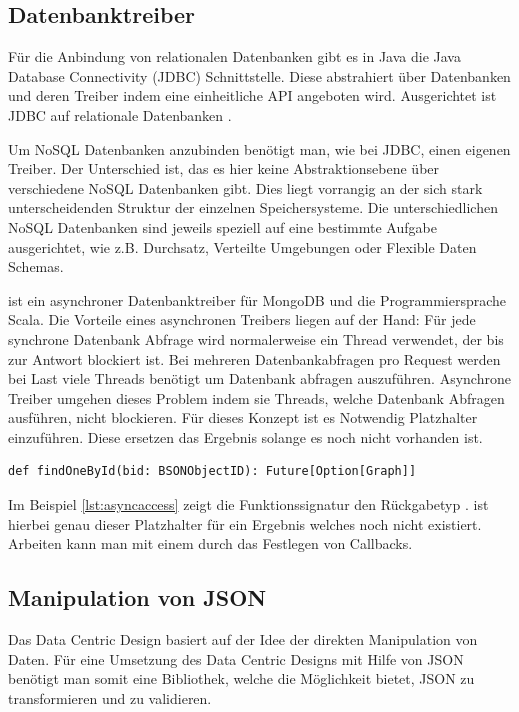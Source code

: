 \subsection{Datenbanktreiber}
\label{sec:reactive}
Für die Anbindung von relationalen Datenbanken gibt es in Java die Java Database Connectivity (JDBC) Schnittstelle. Diese abstrahiert über Datenbanken und deren Treiber indem eine einheitliche API angeboten wird. Ausgerichtet ist JDBC auf relationale Datenbanken \cite{reese2000database}.

Um NoSQL Datenbanken anzubinden benötigt man, wie bei JDBC, einen eigenen Treiber. Der Unterschied ist, das es hier keine Abstraktionsebene über verschiedene NoSQL Datenbanken gibt. Dies liegt vorrangig an der sich stark unterscheidenden Struktur der einzelnen Speichersysteme. Die unterschiedlichen NoSQL Datenbanken sind jeweils speziell auf eine bestimmte Aufgabe ausgerichtet, wie z.B. Durchsatz, Verteilte Umgebungen oder Flexible Daten Schemas. 

 ist ein asynchroner Datenbanktreiber für MongoDB und die Programmiersprache Scala. Die Vorteile eines asynchronen Treibers liegen auf der Hand: Für jede synchrone Datenbank Abfrage wird normalerweise ein Thread verwendet, der bis zur Antwort blockiert ist. Bei mehreren Datenbankabfragen pro Request werden bei Last viele Threads benötigt um Datenbank abfragen auszuführen. Asynchrone Treiber umgehen dieses Problem indem sie Threads, welche Datenbank Abfragen ausführen, nicht blockieren. Für dieses Konzept ist es Notwendig Platzhalter einzuführen. Diese ersetzen das Ergebnis solange es noch nicht vorhanden ist.

\begin{lstlisting}[label=lst:asyncaccess, caption=Funktionssignatur für asynchronen Datenbankzugriff]
def findOneById(bid: BSONObjectID): Future[Option[Graph]]
\end{lstlisting}
 
Im Beispiel \ref{lst:asyncaccess} zeigt die Funktionssignatur den Rückgabetyp .  ist hierbei genau dieser Platzhalter für ein Ergebnis welches noch nicht existiert. Arbeiten kann man mit einem  durch das Festlegen von Callbacks.


\subsection{Manipulation von JSON}
Das Data Centric Design basiert auf der Idee der direkten Manipulation von Daten. Für eine Umsetzung des Data Centric Designs mit Hilfe von JSON benötigt man somit eine Bibliothek, welche die Möglichkeit bietet, JSON zu transformieren und zu validieren.
 
